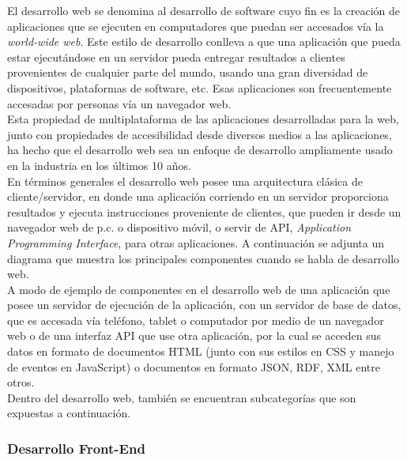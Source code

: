 El desarrollo web se denomina al desarrollo de software cuyo fin es la creación de aplicaciones que se ejecuten en computadores que puedan ser accesados vía la \emph{world-wide web}. Este estilo de desarrollo conlleva a que una aplicación que pueda estar ejecutándose en un servidor pueda entregar resultados a clientes provenientes de cualquier parte del mundo, usando una gran diversidad de dispositivos, plataformas de software, etc. Esas aplicaciones son frecuentemente accesadas por personas vía un navegador web.\\

Esta propiedad de multiplataforma de las aplicaciones desarrolladas para la web, junto con propiedades de accesibilidad desde diversos medios a las aplicaciones, ha hecho que el desarrollo web sea un enfoque de desarrollo ampliamente usado en la industria en los últimos 10 años.\\

En términos generales el desarrollo web posee una arquitectura clásica de cliente/servidor, en donde una aplicación corriendo en un servidor proporciona resultados y ejecuta instrucciones proveniente de clientes, que pueden ir desde un navegador web de p.c. o dispositivo móvil, o servir de API, \emph{Application Programming Interface}, para otras aplicaciones. A continuación se adjunta un diagrama que muestra los principales componentes cuando se habla de desarrollo web.\\


A modo de ejemplo de componentes en el desarrollo web de una aplicación que posee un servidor de ejecución de la aplicación, con un servidor de base de datos, que es accesada vía teléfono, tablet o computador por medio de un navegador web o de una interfaz API que use otra aplicación, por la cual se acceden sus datos en formato de documentos HTML (junto con sus estilos en CSS y manejo de eventos en JavaScript) o documentos en formato JSON, RDF, XML entre otros.\\

Dentro del desarrollo web, también se encuentran subcategorías que son expuestas a continuación.

\subsubsection{Desarrollo Front-End} %
\label{ssub:desarrollo_front_end}

